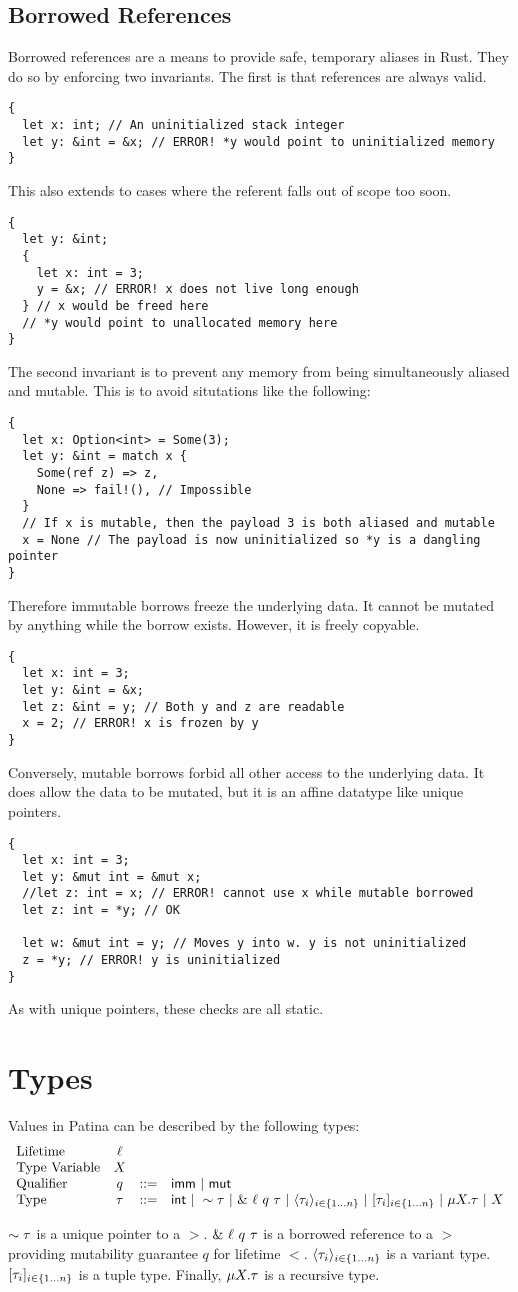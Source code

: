 \subsection*{Borrowed References}
Borrowed references are a means to provide safe, temporary aliases in Rust.
They do so by enforcing two invariants.
The first is that references are always valid.
\begin{verbatim}
{
  let x: int; // An uninitialized stack integer
  let y: &int = &x; // ERROR! *y would point to uninitialized memory
}
\end{verbatim}
This also extends to cases where the referent falls out of scope too soon.
\begin{verbatim}
{
  let y: &int;
  {
    let x: int = 3;
    y = &x; // ERROR! x does not live long enough
  } // x would be freed here
  // *y would point to unallocated memory here
}
\end{verbatim}
The second invariant is to prevent any memory from being simultaneously aliased and mutable.
This is to avoid situtations like the following:
\begin{verbatim}
{
  let x: Option<int> = Some(3);
  let y: &int = match x {
    Some(ref z) => z,
    None => fail!(), // Impossible
  }
  // If x is mutable, then the payload 3 is both aliased and mutable
  x = None // The payload is now uninitialized so *y is a dangling pointer
}
\end{verbatim}
Therefore immutable borrows freeze the underlying data.
It cannot be mutated by anything while the borrow exists.
However, it is freely copyable.
\begin{verbatim}
{
  let x: int = 3;
  let y: &int = &x;
  let z: &int = y; // Both y and z are readable
  x = 2; // ERROR! x is frozen by y
}
\end{verbatim}
Conversely, mutable borrows forbid all other access to the underlying data.
It does allow the data to be mutated, but it is an affine datatype like unique pointers.
\begin{verbatim}
{
  let x: int = 3;
  let y: &mut int = &mut x;
  //let z: int = x; // ERROR! cannot use x while mutable borrowed
  let z: int = *y; // OK

  let w: &mut int = y; // Moves y into w. y is not uninitialized
  z = *y; // ERROR! y is uninitialized
}
\end{verbatim}
As with unique pointers, these checks are all static.

\section*{Types}
Values in Patina can be described by the following types:
\[
\begin{array}{lccl}
\textrm{Lifetime} & \ell & & \\
\textrm{Type Variable} & X & & \\
\textrm{Qualifier} & q & ::= & \mathsf{imm} ~|~ \mathsf{mut} \\
\textrm{Type} & \tau & ::= & \mathsf{int} ~|~ \sim{\tau} ~|~ \&~{{\ell}~{q}~{\tau}} ~|~ 
				\langle{{\tau}_{i}}\rangle_{{i} \in \{1 \ldots {n}\} } ~|~ [{{\tau}_{i}}]_{{i} \in \{1 \ldots {n}\} } ~|~ 
				\mu {X}.{\tau} ~|~ X \\
\end{array}
\]

$\sim{\tau}$ is a unique pointer to a $\gt$.
$\&~{{\ell}~{q}~{\tau}}$ is a borrowed reference to a $\gt$
providing mutability guarantee $q$ for lifetime $\lt$.
$\langle{{\tau}_{i}}\rangle_{{i} \in \{1 \ldots {n}\} }$ is a variant type.
$[{{\tau}_{i}}]_{{i} \in \{1 \ldots {n}\} }$ is a tuple type.
Finally, $\mu {X}.{\tau}$ is a recursive type.
